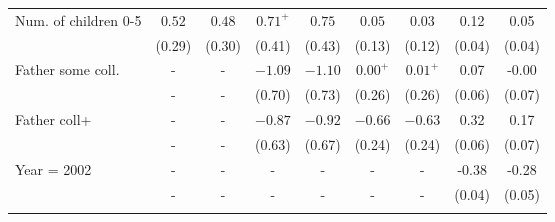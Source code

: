 \begin{tabular}{lcccccccc}
Num. of children 0-5&$0.52$&$0.48$&$0.71^{+}$&$0.75$&$0.05$&$0.03$&0.12&0.05\\
&(0.29)&(0.30)&(0.41)&(0.43)&(0.13)&(0.12)&(0.04)&(0.04)\\
Father some coll.&-&-&$-1.09$&$-1.10$&$0.00^{+}$&$0.01^{+}$&0.07&-0.00\\
&-&-&(0.70)&(0.73)&(0.26)&(0.26)&(0.06)&(0.07)\\
Father coll+&-&-&$-0.87$&$-0.92$&$-0.66$&$-0.63$&0.32&0.17\\
&-&-&(0.63)&(0.67)&(0.24)&(0.24)&(0.06)&(0.07)\\
Year = 2002&-&-&-&-&-&-&-0.38&-0.28\\
&-&-&-&-&-&-&(0.04)&(0.05)\\
\\
\bottomrule\end{tabular}